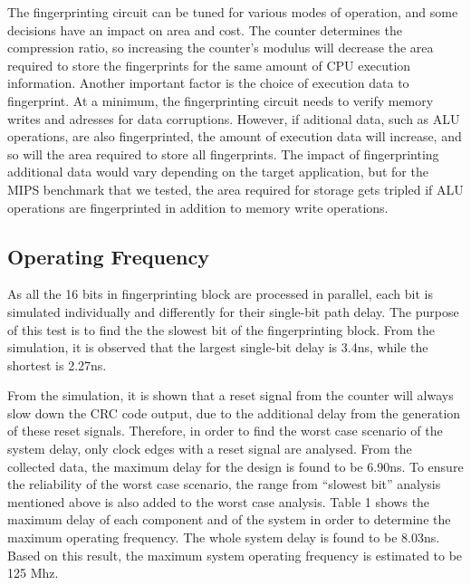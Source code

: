 \documentclass[10pt,journal,compsoc]{IEEEtran}
\begin{document}
The fingerprinting circuit can be tuned for various modes of operation, and some decisions have an impact on area and cost. The counter determines the compression ratio, so increasing the counter's modulus will decrease the area required to store the fingerprints for the same amount of CPU execution information. Another important factor is the choice of execution data to fingerprint. At a minimum, the fingerprinting circuit needs to verify memory writes and adresses for data corruptions. However, if aditional data, such as ALU operations, are also fingerprinted, the amount of execution data will increase, and so will the area required to store all fingerprints. The impact of fingerprinting additional data would vary depending on the target application, but for the MIPS benchmark that we tested, the area required for storage gets tripled if ALU operations are fingerprinted in addition to memory write operations. 

\subsection{Operating Frequency}

 
As all the 16 bits in fingerprinting block are processed in parallel, each bit is simulated individually and differently for their single-bit path delay. The purpose of this test is to find the the slowest bit of the fingerprinting block. From the simulation, it is observed that the largest single-bit delay is 3.4ns, while the shortest is 2.27ns.

 From the simulation, it is shown that a reset signal from the counter will always slow down the CRC code output, due to the additional delay from the generation of these reset signals. Therefore, in order to find the worst case scenario of the system delay, only clock edges with a reset signal are analysed. From the collected data, the maximum delay for the design is found to be 6.90ns. To ensure the reliability of the worst case scenario, the range from “slowest bit” analysis mentioned above is also added to the worst case analysis. Table 1 shows the maximum delay of each component and of the system in order to determine the maximum operating frequency. The whole system delay is found to be 8.03ns. Based on this result, the maximum system operating frequency is estimated to be 125 Mhz. 
    
\end{document}

